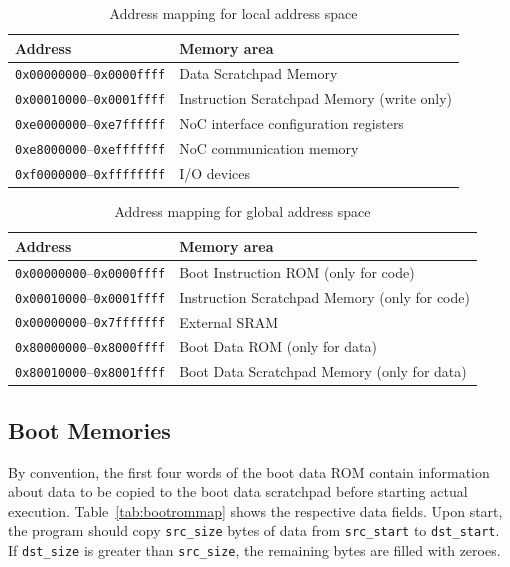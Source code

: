 \documentclass[a4paper,fontsize=10pt,twoside,DIV15,BCOR12mm,headinclude=true,footinclude=false,pagesize,bibtotoc]{scrbook}
\newcommand{\code}[1]{{\texttt{#1}}}
\begin{document}
\begin{table}
\centering
\begin{tabular}{ll}
\toprule
Address & Memory area \\
\midrule
\code{0x00000000}--\code{0x0000ffff} & Data Scratchpad Memory \\
\code{0x00010000}--\code{0x0001ffff} & Instruction Scratchpad Memory (write only) \\
\code{0xe0000000}--\code{0xe7ffffff} & NoC interface configuration registers \\
\code{0xe8000000}--\code{0xefffffff} & NoC communication memory \\
\code{0xf0000000}--\code{0xffffffff} & I/O devices \\
\bottomrule
\end{tabular}
\caption{Address mapping for local address space}
\label{tab:lmmap}
\end{table}

\begin{table}
\centering
\begin{tabular}{ll}
\toprule
Address & Memory area \\
\midrule
\code{0x00000000}--\code{0x0000ffff} & Boot Instruction ROM (only for code) \\
\code{0x00010000}--\code{0x0001ffff} & Instruction Scratchpad Memory (only for code) \\
\code{0x00000000}--\code{0x7fffffff} & External SRAM \\
\code{0x80000000}--\code{0x8000ffff} & Boot Data ROM (only for data) \\
\code{0x80010000}--\code{0x8001ffff} & Boot Data Scratchpad Memory (only for data) \\
\bottomrule
\end{tabular}
\caption{Address mapping for global address space}
\label{tab:gmmap}
\end{table}

\subsection{Boot Memories}

By convention, the first four words of the boot data ROM contain
information about data to be copied to the boot data scratchpad before
starting actual execution. Table~\ref{tab:bootrommap} shows the
respective data fields. Upon start, the program should copy
\code{src\_size} bytes of data from \code{src\_start} to
\code{dst\_start}. If \code{dst\_size} is greater than
\code{src\_size}, the remaining bytes are filled with zeroes.
\end{document}
